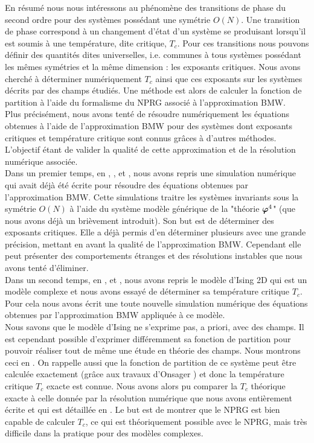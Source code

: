 \documentclass[10.5pt]{article}
\begin{document}
\begin{multicols*}{2}
En résumé nous nous intéressons au phénomène des transitions de phase du second ordre pour des systèmes possédant une symétrie $O(N)$. Une transition de phase correspond à un changement d'état d'un système se produisant lorsqu'il est soumis à une température, dite critique, $T_c$. Pour ces transitions nous pouvons définir des quantités dites universelles, i.e. communes à tous systèmes possédant les mêmes symétries et la même dimension : les exposants critiques. Nous avons cherché à déterminer numériquement $T_c$ ainsi que ces exposants sur les systèmes décrits par des champs étudiés. Une méthode est alors de calculer la fonction de partition à l'aide du formalisme du NPRG associé à l'approximation BMW. \\


Plus précisément, nous avons tenté de résoudre numériquement les équations obtenues à l'aide de l'approximation BMW pour des systèmes dont exposants critiques et température critique sont connus grâces à d'autres méthodes. L'objectif étant de valider la qualité de cette approximation et de la résolution numérique associée.\\


Dans un premier temps, en , , et , nous avons repris une simulation numérique \cite{LeonardThesis} qui avait déjà été écrite pour résoudre des équations obtenues par l'approximation BMW. Cette simulations traitre les systèmes invariants sous la symétrie $O(N)$ à l'aide du système modèle générique de la "théorie $\boldsymbol{ \varphi}^4$" (que nous avons déjà un brièvement introduit). Son but est de déterminer des exposants critiques. Elle a déjà permis d'en déterminer plusieurs avec une grande précision, mettant en avant la qualité de l'approximation BMW. Cependant elle peut présenter des comportements étranges et des résolutions instables que nous avons tenté d'éliminer. \\

Dans un second temps, en ,  et , nous avons repris le modèle d'Ising 2D qui est un modèle complexe et nous avons essayé de déterminer sa température critique $T_c$. Pour cela nous avons écrit une toute nouvelle simulation numérique des équations obtenues par l'approximation BMW appliquée à ce modèle. \\
\indent
Nous savons que le modèle d'Ising ne s'exprime pas, a priori, avec des champs. Il est cependant possible d'exprimer différemment sa fonction de partition pour pouvoir réaliser tout de même une étude en théorie des champs. Nous montrons ceci en . On rappelle aussi que la fonction de partition de ce système peut être calculée exactement (grâce aux travaux d'Onsager \cite{Onsager}) et donc la température critique $T_c$ exacte est connue. Nous avons alors pu comparer la $T_c$ théorique exacte à celle donnée par la résolution numérique que nous avons entièrement écrite et qui est détaillée en . Le but est de montrer que le NPRG est bien capable de calculer $T_c$, ce qui est théoriquement possible avec le NPRG, mais très difficile dans la pratique pour des modèles complexes.\\



\end{multicols*}
\end{document}
